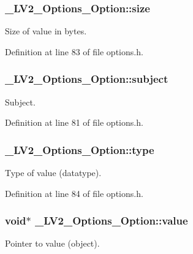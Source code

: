 \subsubsection[{\texorpdfstring{size}{size}}]{ \+\_\+\+L\+V2\+\_\+\+Options\+\_\+\+Option\+::size}\hypertarget{struct___l_v2___options___option_a4ac2d47dde5b32b4ef50984bd2d295d0}{}\label{struct___l_v2___options___option_a4ac2d47dde5b32b4ef50984bd2d295d0}
Size of value in bytes. 

Definition at line 83 of file options.\+h.

\subsubsection[{\texorpdfstring{subject}{subject}}]{ \+\_\+\+L\+V2\+\_\+\+Options\+\_\+\+Option\+::subject}\hypertarget{struct___l_v2___options___option_ac4e61e2cfc81ce5682c6516152860f98}{}\label{struct___l_v2___options___option_ac4e61e2cfc81ce5682c6516152860f98}
Subject. 

Definition at line 81 of file options.\+h.

\subsubsection[{\texorpdfstring{type}{type}}]{ \+\_\+\+L\+V2\+\_\+\+Options\+\_\+\+Option\+::type}\hypertarget{struct___l_v2___options___option_a8a86ffd887b16e98fc7d6a67e33c446c}{}\label{struct___l_v2___options___option_a8a86ffd887b16e98fc7d6a67e33c446c}
Type of value (datatype). 

Definition at line 84 of file options.\+h.

\subsubsection[{\texorpdfstring{value}{value}}]{ {\bf void}$\ast$ \+\_\+\+L\+V2\+\_\+\+Options\+\_\+\+Option\+::value}\hypertarget{struct___l_v2___options___option_a64157bd81b2ddd66ed1248d9a9ca00ba}{}\label{struct___l_v2___options___option_a64157bd81b2ddd66ed1248d9a9ca00ba}
Pointer to value (object). 

